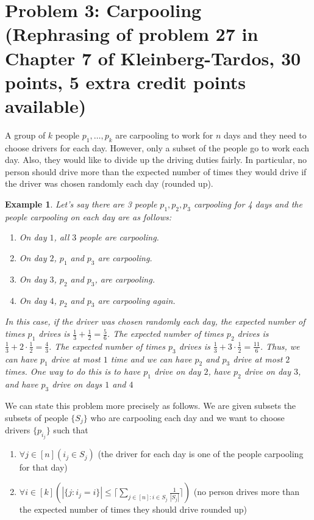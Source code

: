 \documentclass[12pt]{article}
\newtheorem{example}[theorem]{Example}
\begin{document}
\section*{Problem 3: Carpooling (Rephrasing of problem 27 in Chapter 7 of Kleinberg-Tardos, 30 points, 5 extra credit points available)}
A group of $k$ people $p_1,\ldots,p_k$ are carpooling to work for $n$ days and they need to choose drivers for each day. However, only a subset of the people go to work each day. Also, they would like to divide up the driving duties fairly. In particular, no person should drive more than the expected number of times they would drive if the driver was chosen randomly each day (rounded up).
\begin{example}
Let's say there are 3 people $p_1,p_2,p_3$ carpooling for 4 days and the people carpooling on each day are as follows:
\begin{enumerate}
\item On day $1$, all $3$ people are carpooling.
\item On day $2$, $p_1$ and $p_3$ are carpooling.
\item On day $3$, $p_2$ and $p_3$, are carpooling.
\item On day $4$, $p_2$ and $p_3$ are carpooling again.
\end{enumerate}
In this case, if the driver was chosen randomly each day, the expected number of times $p_1$ drives is $\frac{1}{3} + \frac{1}{2} = \frac{5}{6}$. The expected number of times $p_2$ drives is $\frac{1}{3} + 2\cdot\frac{1}{2} = \frac{4}{3}$. The expected number of times $p_3$ drives is $\frac{1}{3} + 3\cdot\frac{1}{2} = \frac{11}{6}$. Thus, we can have $p_1$ drive at most $1$ time and we can have $p_2$ and $p_3$ drive at most $2$ times. One way to do this is to have $p_1$ drive on day $2$, have $p_2$ drive on day $3$, and have $p_3$ drive on days $1$ and $4$
\end{example}
We can state this problem more precisely as follows. We are given subsets the subsets of people $\{S_j\}$ who are carpooling each day and we want to choose drivers $\{p_{i_j}\}$ such that 
\begin{enumerate}
\item $\forall j \in [n] (i_j \in S_j)$ (the driver for each day is one of the people carpooling for that day)
\item $\forall i \in [k]\left(|\{j: i_j = i\}| \leq \lceil\sum_{j \in [n]:i \in S_j}{\frac{1}{|S_j|}}\rceil\right)$ (no person drives more than the expected number of times they should drive rounded up)
\end{enumerate}
\end{document}
